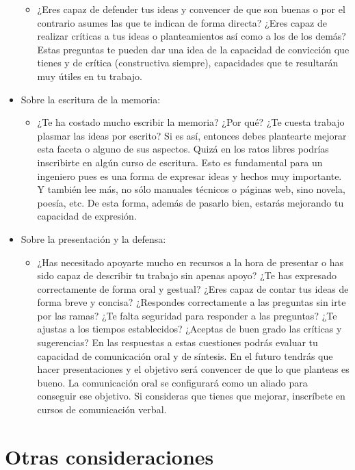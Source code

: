 \begin{itemize}
\begin{itemize}
            \item ¿Eres capaz de defender tus ideas y convencer de que son buenas o por el contrario asumes las que te indican de forma directa? ¿Eres capaz de realizar críticas a tus ideas o planteamientos así como a los de los demás? Estas preguntas te pueden dar una idea de la capacidad de convicción que tienes y de crítica (constructiva siempre), capacidades que te resultarán muy útiles en tu trabajo.
        \end{itemize}
    \item Sobre la escritura de la memoria:
        \begin{itemize}
            \item ¿Te ha costado mucho escribir la memoria? ¿Por qué? ¿Te cuesta trabajo plasmar las ideas por escrito? Si es así, entonces debes plantearte mejorar esta faceta o alguno de sus aspectos. Quizá en los ratos libres podrías inscribirte en algún curso de escritura. Esto es fundamental para un ingeniero pues es una forma de expresar ideas y hechos muy importante. Y también lee más, no sólo manuales técnicos o páginas web, sino novela, poesía, etc. De esta forma, además de pasarlo bien, estarás mejorando tu capacidad de expresión.
        \end{itemize}
    \item Sobre la presentación y la defensa:
        \begin{itemize}
            \item ¿Has necesitado apoyarte mucho en recursos a la hora de presentar o has sido capaz de describir tu trabajo sin apenas apoyo? ¿Te has expresado correctamente de forma oral y gestual? ¿Eres capaz de contar tus ideas de forma breve y concisa? ¿Respondes correctamente a las preguntas sin irte por las ramas? ¿Te falta seguridad para responder a las preguntas? ¿Te ajustas a los tiempos establecidos? ¿Aceptas de buen grado las críticas y sugerencias? En las respuestas a estas cuestiones podrás evaluar tu capacidad de comunicación oral y de síntesis. En el futuro tendrás que hacer presentaciones y el objetivo será convencer de que lo que planteas es bueno. La comunicación oral se configurará como un aliado para conseguir ese objetivo. Si consideras que tienes que mejorar, inscríbete en cursos de comunicación verbal.
        \end{itemize}
\end{itemize}


\section{Otras consideraciones}
